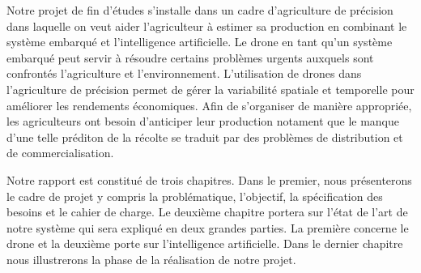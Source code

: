 Notre projet de fin d'études s'installe dans un cadre d'agriculture de précision dans laquelle on veut aider l'agriculteur à estimer sa production en combinant le système embarqué et l'intelligence artificielle. Le drone en tant qu'un système embarqué peut servir à résoudre certains problèmes urgents auxquels sont confrontés l'agriculture et l'environnement. L'utilisation de drones dans l'agriculture de précision permet de gérer la variabilité spatiale et temporelle pour améliorer les rendements économiques. Afin de s'organiser de manière appropriée, les agriculteurs ont besoin d'anticiper leur production notament que le manque d'une telle préditon de la récolte se traduit par des problèmes de distribution et de commercialisation.


Notre rapport est constitué de trois chapitres. Dans le premier, nous présenterons le cadre de projet y compris la problématique, l'objectif, la spécification des besoins et le cahier de charge. Le deuxième chapitre portera sur l'état de l'art de notre système qui sera expliqué en deux grandes parties. La première concerne le drone et la deuxième porte sur l'intelligence artificielle. Dans le dernier chapitre nous illustrerons la phase de la réalisation de notre projet.


	
	
	
	
	
	
	
